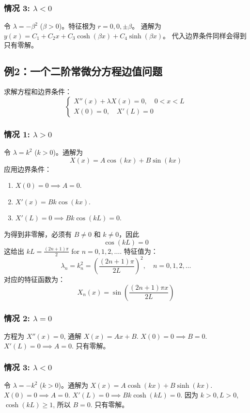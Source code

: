 \documentclass{article}
\begin{document}
	\subsubsection{情况 3: $\lambda < 0$}
	令 $\lambda = -\beta^2$ ($\beta > 0$)。特征根为 $r=0, 0, \pm\beta$。
	通解为 $y(x) = C_1 + C_2 x + C_3 \cosh(\beta x) + C_4 \sinh(\beta x)$。
	代入边界条件同样会得到只有零解。
	
	\subsection{例2：一个二阶常微分方程边值问题}
	
	
	求解方程和边界条件：
	$$
	\begin{cases}
		X''(x) + \lambda X(x) = 0, \quad 0 < x < L \\
		X(0)=0, \quad X'(L)=0
	\end{cases}
	$$
	\subsubsection{情况 1: $\lambda > 0$}
	令 $\lambda = k^2$ ($k>0$)。通解为
	$$
	X(x) = A \cos(kx) + B \sin(kx)
	$$
	应用边界条件：
	\begin{enumerate}
		\item $X(0) = 0 \implies A = 0$.
		\item $X'(x) = Bk \cos(kx)$.
		\item $X'(L) = 0 \implies Bk \cos(kL) = 0$.
	\end{enumerate}
	为得到非零解，必须有 $B \neq 0$ 和 $k \neq 0$，因此
	$$
	\cos(kL) = 0
	$$
	这给出 $kL = \frac{(2n+1)\pi}{2}$ for $n=0, 1, 2, \dots$.
	特征值为：
	$$
	\lambda_n = k_n^2 = \left( \frac{(2n+1)\pi}{2L} \right)^2, \quad n=0, 1, 2, \dots
	$$
	对应的特征函数为：
	$$
	X_n(x) = \sin\left( \frac{(2n+1)\pi x}{2L} \right)
	$$
	
	\subsubsection{情况 2: $\lambda = 0$}
	方程为 $X''(x)=0$, 通解 $X(x) = Ax+B$.
	$X(0)=0 \implies B=0$.
	$X'(L)=0 \implies A=0$. 只有零解。
	
	\subsubsection{情况 3: $\lambda < 0$}
	令 $\lambda = -k^2$ ($k>0$)。通解为 $X(x) = A \cosh(kx) + B \sinh(kx)$.
	$X(0)=0 \implies A=0$.
	$X'(L)=0 \implies Bk \cosh(kL)=0$. 因为 $k>0, L>0$, $\cosh(kL) \ge 1$, 所以 $B=0$. 只有零解。
	
\end{document}
